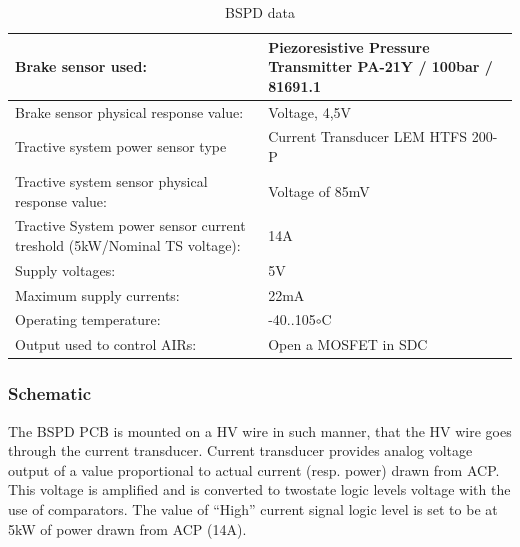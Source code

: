 \begin{table}[H]
	\centering
	\caption{BSPD data}
	\begin{tabularx}{\textwidth}{|X|X|}
		\hline
		Brake sensor used: & Piezoresistive Pressure Transmitter PA-21Y / 100bar / 81691.1 \\[\TableSize]
		\hline
		Brake sensor physical response value: & Voltage, 4,5V \\[\TableSize]
		\hline
		Tractive system power sensor type & Current Transducer LEM HTFS 200-P \\[\TableSize]
		\hline
		Tractive system sensor physical response value: & Voltage of 85mV \\[\TableSize]
		\hline
		Tractive System power sensor current treshold (5kW/Nominal TS voltage): & 14A \\[\TableSize]
		\hline
		Supply voltages: & 5V \\[\TableSize]
		\hline
		Maximum supply currents: & 22mA \\[\TableSize]
		\hline
		Operating temperature: & -40..105$\circ$C\\[\TableSize]
		\hline
		Output used to control AIRs: & Open a MOSFET in SDC \\[\TableSize]
		\hline
	\end{tabularx}%
	\label{tab:addlabel}%
\end{table}%

\subsubsection{Schematic}
The BSPD PCB is mounted on a HV wire in such manner, that the HV wire goes through the
current transducer. Current transducer provides analog voltage output of a value proportional to
actual current (resp. power) drawn from ACP. This voltage is amplified and is converted to twostate
logic levels voltage with the use of comparators. The value of “High” current signal logic level
is set to be at 5kW of power drawn from ACP (14A).


